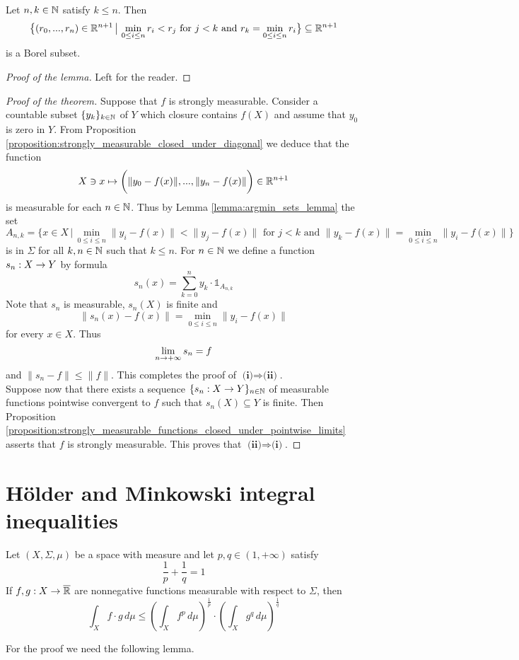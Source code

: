 \begin{lemma}\label{lemma:argmin_sets_lemma}
Let $n,k\in {\mathbb N}$ satisfy $k \leq n$. Then
$$\big\{(r_0,...,r_n)\in {\mathbb R}^{n+1}\,\big|\,\min_{0\leq i\leq n} r_i < r_j\mbox{ for }j < k\mbox{ and }r_k = \min_{0\leq i\leq n} r_i\big\} \subseteq {\mathbb R}^{n+1}$$
is a Borel subset.
\end{lemma}
\begin{proof}[Proof of the lemma]
Left for the reader.
\end{proof}

\begin{proof}[Proof of the theorem]
Suppose that $f$ is strongly measurable. Consider a countable subset $\{y_k\}_{k\in {\mathbb N}}$ of $Y$ which closure contains $f(X)$ and assume that $y_0$ is zero in $Y$. From Proposition \ref{proposition:strongly_measurable_closed_under_diagonal} we deduce that the function
$$X\ni x\mapsto \bigg(\lVert y_0 - f(x)\rVert,...,\lVert y_n - f(x)\rVert \bigg)\in {\mathbb R}^{n+1}$$
is measurable for each $n \in {\mathbb N}$. Thus by Lemma \ref{lemma:argmin_sets_lemma} the set
$$A_{n,k} = \big\{x \in X\,\big|\,\min_{0\leq i\leq n}\lVert y_i - f(x)\rVert < \lVert y_j - f(x)\rVert \mbox{ for }j < k\mbox{ and }\lVert y_k - f(x)\rVert = \min_{0\leq i\leq n}\lVert y_i - f(x)\rVert\big\}$$
is in $\Sigma$ for all $k,n\in {\mathbb N}$ such that $k \leq n$. For $n\in {\mathbb N}$ we define a function $s_n:X\rightarrow Y$ by formula
$$s_n(x) = \sum_{k=0}^ny_k\cdot \mathbb{1}_{A_{n,k}}$$
Note that $s_n$ is measurable, $s_n(X)$ is finite and
$$\lVert s_n(x) - f(x)\rVert = \min_{0\leq i\leq n}\lVert y_i - f(x)\rVert$$
for every $x \in X$. Thus
$$\lim_{n\rightarrow +\infty}s_n = f$$
and $\lVert s_n - f\rVert \leq  \lVert f\rVert$. This completes the proof of $\textbf{(i)}\Rightarrow \textbf{(ii)}$.\\
Suppose now that there exists a sequence $\{s_n:X\rightarrow Y\}_{n\in {\mathbb N}}$ of measurable functions pointwise convergent to $f$ such that $s_n(X)\subseteq Y$ is finite. Then Proposition \ref{proposition:strongly_measurable_functions_closed_under_pointwise_limits} asserts that $f$ is strongly measurable. This proves that $\textbf{(ii)}\Rightarrow \textbf{(i)}$.
\end{proof}

\section{H{\"o}lder and Minkowski integral inequalities}

\begin{theorem}[H{\"o}lder]\label{theorem:holder_inequality}
Let $(X,\Sigma,\mu)$ be a space with measure and let $p,q \in (1,+\infty)$ satisfy
$$\frac{1}{p} + \frac{1}{q} = 1$$
If $f,g:X\rightarrow \overline{{\mathbb R}}$ are nonnegative functions measurable with respect to $\Sigma$, then
$$\int_X f\cdot g\,d\mu \leq \left(\int_X f^p\,d\mu\right)^{\frac{1}{p}}\cdot \left(\int_X g^q\,d\mu\right)^{\frac{1}{q}} $$
\end{theorem}
\noindent
For the proof we need the following lemma.

